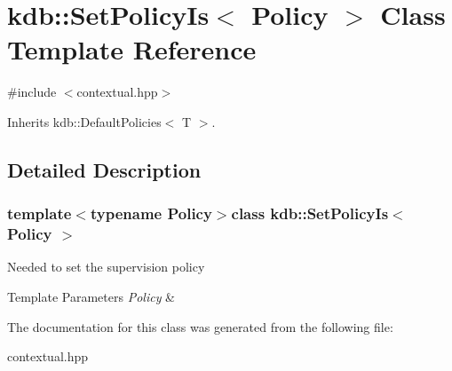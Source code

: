 \hypertarget{classkdb_1_1SetPolicyIs}{\section{kdb\-:\-:Set\-Policy\-Is$<$ Policy $>$ Class Template Reference}
\label{classkdb_1_1SetPolicyIs}
}


{\ttfamily \#include $<$contextual.\-hpp$>$}



Inherits kdb\-::\-Default\-Policies$<$ T $>$.



\subsection{Detailed Description}
\subsubsection*{template$<$typename Policy$>$class kdb\-::\-Set\-Policy\-Is$<$ Policy $>$}

Needed to set the supervision policy


\begin{DoxyTemplParams}{Template Parameters}
{\em Policy} & \\
\hline
\end{DoxyTemplParams}


The documentation for this class was generated from the following file\-:\begin{DoxyCompactItemize}
\item 
contextual.\-hpp\end{DoxyCompactItemize}
